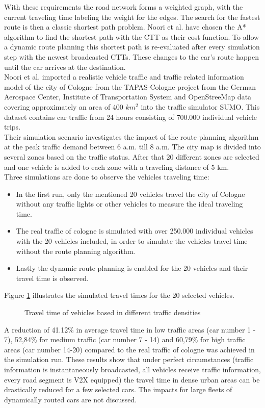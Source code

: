 \documentclass{sig-alternate}
\begin{document}
With these requirements the road network forms a weighted graph, with the current traveling time labeling the weight for the edges. The search for the fastest route is then a classic shortest path problem. Noori et al. have chosen the A* algorithm to find the shortest path with the CTT as their cost function. To allow a dynamic route planning this shortest path is re-evaluated after every simulation step with the newest broadcasted CTTs. These changes to the car's route happen until the car arrives at the destination. \\
Noori et al. imported a realistic vehicle traffic and traffic related information model of the city of Cologne from the TAPAS-Cologne project from the German Aerospace Center, Institute of Transportation System and OpenStreeMap data covering  approximately an area of 400 $km^2$ into the traffic simulator SUMO. This dataset contains car traffic from 24 hours consisting of 700.000 individual vehicle trips. \\
Their simulation scenario investigates the impact of the route planning algorithm at the peak traffic demand between 6 a.m. till 8 a.m. The city map is divided into several zones based on the traffic status. After that 20 different zones are selected and one vehicle is added to each zone with a traveling distance of 5 km. \\
Three simulations are done to observe the vehicles traveling time:
\begin{itemize}
\item In the first run, only the mentioned 20 vehicles travel the city of Cologne without any traffic lights or other vehicles to measure the ideal traveling time.
\item The real traffic of cologne is simulated with over 250.000 individual vehicles with the 20 vehicles included, in order to simulate the vehicles travel time without the route planning algorithm.
\item Lastly the dynamic route planning is enabled for the 20 vehicles and their travel time is observed. 
\end{itemize}
Figure \ref{fig:noori1} illustrates the simulated travel times for the 20 selected vehicles. 
\begin{figure} 
\centering
{}
\caption{Travel time of vehicles based in different traffic densities}
\label{fig:noori1}
\end{figure}
A reduction of 41.12\%  in average travel time in low traffic areas (car number 1 - 7), 52,84\% for medium traffic (car number 7 - 14) and 60,79\% for high traffic areas (car number 14-20) compared to the real traffic of cologne was achieved in the simulation run. These results show that under perfect circumstances (traffic information is instantaneously broadcasted, all vehicles receive traffic information, every road segment is V2X equipped) the travel time in dense urban areas can be drastically reduced for a few selected cars. The impacts for large fleets of dynamically routed cars are not discussed. 
\end{document}

